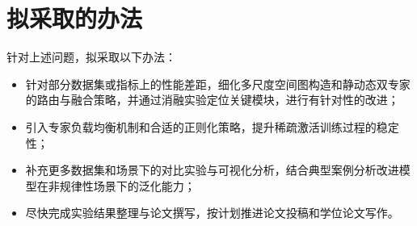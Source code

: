 \section{拟采取的办法}

针对上述问题，拟采取以下办法：
\begin{itemize}
    \item 针对部分数据集或指标上的性能差距，细化多尺度空间图构造和静动态双专家的路由与融合策略，并通过消融实验定位关键模块，进行有针对性的改进；
    \item 引入专家负载均衡机制和合适的正则化策略，提升稀疏激活训练过程的稳定性；
    \item 补充更多数据集和场景下的对比实验与可视化分析，结合典型案例分析改进模型在非规律性场景下的泛化能力；
    \item 尽快完成实验结果整理与论文撰写，按计划推进论文投稿和学位论文写作。
\end{itemize}
